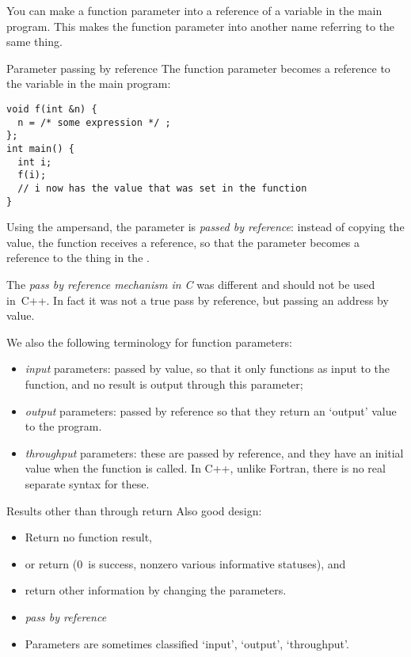 You can make a function parameter into a reference of a variable in
the main program. This makes the function parameter into another name referring
to the same thing.

\begin{block}{Parameter passing by reference}
  \label{sl:pass-by-ref}
The function parameter  becomes a reference to the variable 
in the main program:
\begin{lstlisting}
void f(int &n) {
  n = /* some expression */ ;
};
int main() {
  int i;
  f(i);
  // i now has the value that was set in the function
}
\end{lstlisting}
\end{block}

Using the ampersand, the parameter is
\emph{passed by reference}:
instead of copying the value, the function receives a reference,
so that the parameter becomes a reference to the thing
in the .

\begin{remark}
  The \emph{pass by reference mechanism in C}%
  was different and should not be used in~C++. In fact it was not a
  true pass by reference, but passing an address by value.
\end{remark}

We also the following terminology for function parameters:
\begin{itemize}
\item \emph{input} parameters: passed by
  value, so that it only functions as input to the function, and no
  result is output through this parameter;
\item \emph{output} parameters: passed
  by reference so that they return an `output' value to the program.
\item \emph{throughput} parameters:
  these are passed by reference, and they have an initial value when
  the function is called. In C++, unlike Fortran, there is no real
  separate syntax for these.
\end{itemize}

\begin{slide}{Results other than through return}
  \label{sl:func-err-return}
  Also good design:
  \begin{itemize}
  \item Return no function result,
  \item or return  (0~is success, nonzero various
    informative statuses), and
  \item return other information by changing the parameters.
  \item \emph{pass by reference}
  \item Parameters are sometimes classified `input', `output', `throughput'.
  \end{itemize}
\end{slide}


